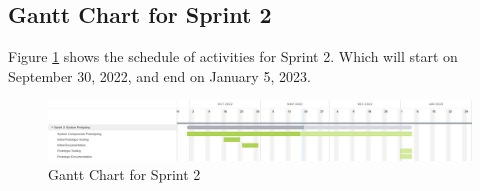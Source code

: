 \subsection{Gantt Chart for Sprint 2}
\label{subsec:gantt_chart_sprint2}
Figure \ref{fig:gantt_chart_sprint2} shows the schedule of activities 
for Sprint 2. Which will start on September 30, 2022, and end on January 5, 2023.
\begin{figure}[ht]
    \centering
    \includegraphics[width=1\textwidth]{./assets/Gantt_Chart_Sprint2.png}
    \caption{Gantt Chart for Sprint 2}
    \label{fig:gantt_chart_sprint2}
\end{figure}
\FloatBarrier